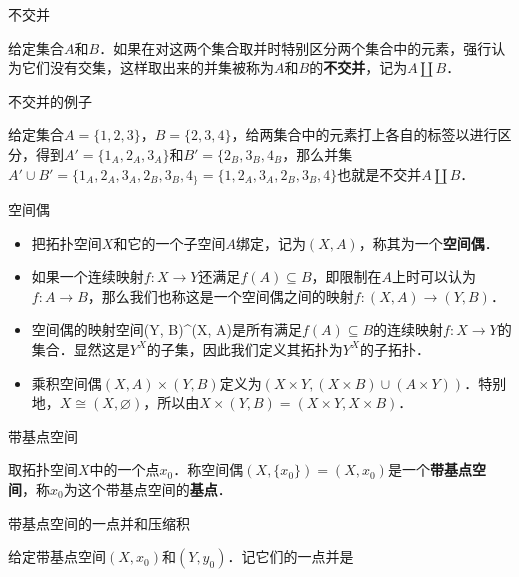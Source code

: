 
\begin{definition}{不交并}

给定集合$A$和$B$．如果在对这两个集合取并时特别区分两个集合中的元素，强行认为它们没有交集，这样取出来的并集被称为$A$和$B$的\textbf{不交并}，记为$A\amalg B$．

\end{definition}

\begin{example}{不交并的例子}

给定集合$A=\{1,2,3\}$，$B=\{2,3,4\}$，给两集合中的元素打上各自的标签以进行区分，得到$A'=\{1_A, 2_A, 3_A\}$和$B'=\{2_B, 3_B, 4_B$，那么并集$A'\cup B'=\{1_A, 2_A, 3_A, 2_B, 3_B, 4_\}=\{1, 2_A, 3_A, 2_B, 3_B, 4\}$也就是不交并$A\amalg B$．

\end{example}

\begin{definition}{空间偶}
\begin{itemize}
\item 把拓扑空间$X$和它的一个子空间$A$绑定，记为$(X, A)$，称其为一个\textbf{空间偶}．
\item 如果一个连续映射$f:X\rightarrow Y$还满足$f(A)\subseteq B$，即限制在$A$上时可以认为$f:A\rightarrow B$，那么我们也称这是一个空间偶之间的映射$f:(X, A)\rightarrow(Y, B)$．
\item 空间偶的映射空间(Y, B)^{(X, A)}是所有满足$f(A)\subseteq B$的连续映射$f:X\rightarrow Y$的集合．显然这是$Y^X$的子集，因此我们定义其拓扑为$Y^X$的子拓扑．
\item 乘积空间偶$(X, A)\times(Y,B)$定义为$(X\times Y, (X\times B)\cup(A\times Y))$．特别地，$X\cong(X, \varnothing)$，所以由$X\times(Y, B)=(X\times Y, X\times B)$．


\end{itemize}
\end{definition}

\begin{definition}{带基点空间}

取拓扑空间$X$中的一个点$x_0$．称空间偶$(X, \{x_0\})=(X, x_0)$是一个\textbf{带基点空间}，称$x_0$为这个带基点空间的\textbf{基点}．

\end{definition}

\begin{definition}{带基点空间的一点并和压缩积}

给定带基点空间$(X, x_0)$和$(Y, y_0)$．记它们的一点并是


\end{definition}
